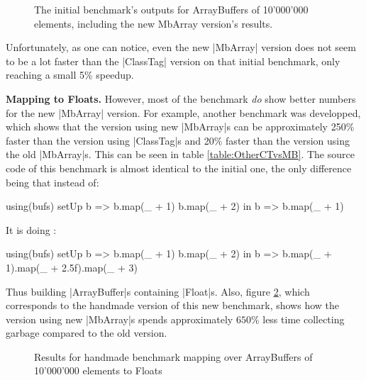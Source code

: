 \begin{figure}
\caption{The initial benchmark's outputs for ArrayBuffers of 10'000'000 elements, including the new MbArray version's results.}
\label{fig:NewGcComp}
\end{figure}

Unfortunately, as one can notice, even the new |MbArray| version does not seem to be a lot faster than the |ClassTag| version on that initial benchmark, only reaching a small 5\% speedup. 

\textbf{Mapping to Floats.} However, most of the benchmark \emph{do} show better numbers for the new |MbArray| version. For example, another benchmark was developped, which shows that the version using new |MbArray|s can be approximately 250\% faster than the version using |ClassTag|s and 20\% faster than the version using the old |MbArray|s. This can be seen in table \ref{table:OtherCTvsMB}. The source code of this benchmark is almost identical to the initial one, the only difference being that instead of:

\begin{lstlisting-nobreak}
  using(bufs) setUp {
    b => 
      b.map(_ + 1)
      b.map(_ + 2)
  } in {
    b => b.map(_ + 1)
  }
\end{lstlisting-nobreak}

It is doing : 

\begin{lstlisting-nobreak}
  using(bufs) setUp {
    b => 
      b.map(_ + 1)
      b.map(_ + 2)
  } in {
    b => b.map(_ + 1).map(_ + 2.5f).map(_ + 3)
  }
\end{lstlisting-nobreak}

Thus building |ArrayBuffer|s containing |Float|s.
Also, figure \ref{fig:OtherGcComp}, which corresponds to the handmade version of this new benchmark, shows how the version using new |MbArray|s spends approximately $650\%$ less time collecting garbage compared to the old version.



\begin{figure}
\caption{Results for handmade benchmark mapping over ArrayBuffers of 10'000'000 elements to Floats}
\label{fig:OtherGcComp}
\end{figure}

